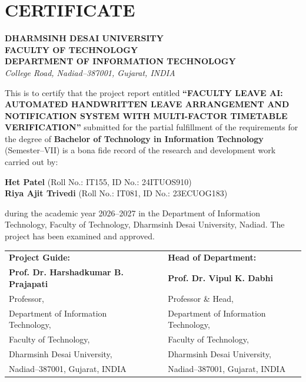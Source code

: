 \documentclass[12pt,letterpaper]{report}
\begin{document}
\chapter*{CERTIFICATE}

\begin{center}
    \textbf{\large DHARMSINH DESAI UNIVERSITY}\\[0.1cm]
    \textbf{FACULTY OF TECHNOLOGY}\\[0.1cm]
    \textbf{DEPARTMENT OF INFORMATION TECHNOLOGY}\\[0.1cm]
    \textit{College Road, Nadiad--387001, Gujarat, INDIA}\\[1.0cm]
\end{center}

This is to certify that the project report entitled \textbf{“FACULTY LEAVE AI: AUTOMATED HANDWRITTEN LEAVE ARRANGEMENT AND NOTIFICATION SYSTEM WITH MULTI-FACTOR TIMETABLE VERIFICATION”} submitted for the partial fulfillment of the requirements for the degree of \textbf{Bachelor of Technology in Information Technology} (Semester--VII) is a bona fide record of the research and development work carried out by:

\begin{center}
    \textbf{Het Patel} (Roll No.: IT155, ID No.: 24ITUOS910)\\[0.2cm]
    \textbf{Riya Ajit Trivedi} (Roll No.: IT081, ID No.: 23ECUOG183)
\end{center}

during the academic year 2026--2027 in the Department of Information Technology, Faculty of Technology, Dharmsinh Desai University, Nadiad. The project has been examined and approved.

\vspace{3.0cm}

\noindent
\begin{tabularx}{\textwidth}{Xp{1.5cm}X}
\textbf{Project Guide:} & & \textbf{Head of Department:} \\[2.0cm]
\textbf{Prof. Dr. Harshadkumar B. Prajapati} & & \textbf{Prof. Dr. Vipul K. Dabhi} \\
Professor, & & Professor \& Head, \\
Department of Information Technology, & & Department of Information Technology, \\
Faculty of Technology, & & Faculty of Technology, \\
Dharmsinh Desai University, & & Dharmsinh Desai University, \\
Nadiad--387001, Gujarat, INDIA & & Nadiad--387001, Gujarat, INDIA
\end{tabularx}
\end{document}
